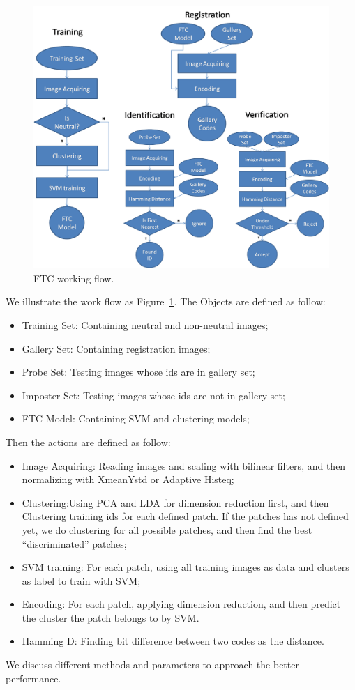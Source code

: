 \documentclass[10pt,twocolumn,letterpaper]{article}
\begin{document}
\begin{figure}[t]
    \begin{center}
        \includegraphics[width=0.8\linewidth]{fig/ftc/ftc_flow.png}
    \end{center}
    \caption{FTC working flow.}
    \label{fig:ftc_flow}
\end{figure}


We illustrate the work flow as Figure~\ref{fig:ftc_flow}. The Objects 
are defined as follow:
\begin{itemize}
    \item Training Set: Containing neutral and non-neutral images; 
    \item Gallery Set: Containing registration images;
    \item Probe Set: Testing images whose ids are in gallery set;
    \item Imposter Set: Testing images whose ids are not in gallery set;
    \item FTC Model: Containing SVM and clustering models;
\end{itemize}

Then the actions are defined as follow:
\begin{itemize}
    \item Image Acquiring: Reading images and scaling with bilinear filters, 
            and then normalizing with XmeanYstd or Adaptive Histeq;
    \item Clustering:Using PCA and LDA for dimension reduction first, 
            and then Clustering training ids for each defined patch. 
            If the patches has not defined yet, we do clustering for all possible
            patches, and then find the best ``discriminated'' patches;
    \item SVM training: For each patch, using all training images as data and clusters
            as label to train with SVM;
    \item Encoding: For each patch, applying dimension reduction,
            and then predict the cluster the patch belongs to by SVM.
    \item Hamming D: Finding bit difference between two codes as the distance.
\end{itemize}
We discuss different methods and parameters to approach the better performance.
\end{document}

